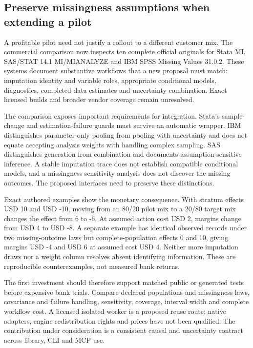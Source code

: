 \hypertarget{preserve-missingness-assumptions-when-extending-a-pilot}{%
\subsection{Preserve missingness assumptions when extending a
pilot}\label{preserve-missingness-assumptions-when-extending-a-pilot}}

A profitable pilot need not justify a rollout to a different customer
mix. The commercial comparison now inspects ten complete official
originals for Stata MI, SAS/STAT 14.1 MI/MIANALYZE and IBM SPSS Missing
Values 31.0.2. These systems document substantive workflows that a new
proposal must match: imputation identity and variable roles, appropriate
conditional models, diagnostics, completed-data estimates and
uncertainty combination. Exact licensed builds and broader vendor
coverage remain unresolved.
\citep{exec21_transport_stata_mi,exec21_transport_stata_substantive,exec21_transport_sas_mi_intro,exec21_transport_spss_missing}

The comparison exposes important requirements for integration. Stata's
sample-change and estimation-failure guards must survive an automatic
wrapper. IBM distinguishes parameter-only pooling from pooling with
uncertainty and does not equate accepting analysis weights with handling
complex sampling. SAS distinguishes generation from combination and
documents assumption-sensitive inference. A stable imputation trace does
not establish compatible conditional models, and a missingness
sensitivity analysis does not discover the missing outcomes. The
proposed interfaces need to preserve these distinctions.
\citep{exec21_transport_stata_estimate,exec21_transport_stata_chained,exec21_transport_sas_mianalyze_intro,exec21_transport_sas_assumptions,exec21_transport_sas_combining,exec21_transport_sas_sensitivity}

Exact authored examples show the monetary consequence. With stratum
effects USD 10 and USD -10, moving from an 80/20 pilot mix to a 20/80
target mix changes the effect from 6 to -6. At assumed action cost USD
2, margins change from USD 4 to USD -8. A separate example has identical
observed records under two missing-outcome laws but complete-population
effects 0 and 10, giving margins USD -4 and USD 6 at assumed cost USD 4.
Neither more imputation draws nor a weight column resolves absent
identifying information. These are reproducible counterexamples, not
measured bank returns. \citep{exec21_transport_reference}

The first investment should therefore support matched public or
generated tests before expensive bank trials. Compare declared
populations and missingness laws, covariance and failure handling,
sensitivity, coverage, interval width and complete workflow cost. A
licensed isolated worker is a proposed reuse route; native adapters,
engine redistribution rights and prices have not been qualified. The
contribution under consideration is a consistent causal and uncertainty
contract across library, CLI and MCP use.


